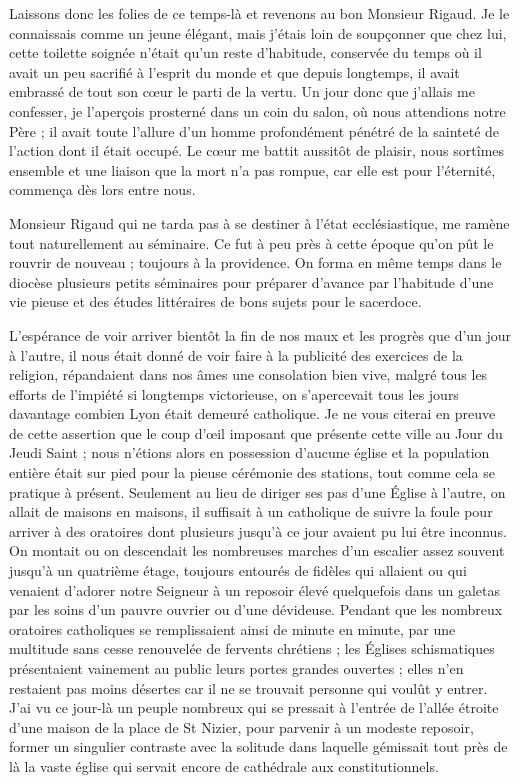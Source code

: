 \documentclass[11pt,a4paper]{report}
\begin{document}
Laissons donc les folies de ce temps-là et revenons au bon Monsieur Rigaud. Je
le connaissais comme un jeune élégant, mais j'étais loin de soupçonner que chez
lui, cette toilette soignée n'était qu'un reste d'habitude, conservée du temps
où il avait un peu sacrifié à l'esprit du monde et que depuis longtemps, il
avait embrassé de tout son cœur le parti de la vertu. Un jour donc que j'allais
me confesser, je l'aperçois prosterné dans un coin du salon, où nous attendions
notre Père ; il avait toute l'allure d'un homme profondément pénétré de la
sainteté de l'action dont il était occupé. Le cœur me battit aussitôt de
plaisir, nous sortîmes ensemble et une liaison que la mort n'a pas rompue, car
elle est pour l'éternité, commença dès lors entre nous.

Monsieur Rigaud qui ne tarda pas à se destiner à l'état ecclésiastique, me
ramène tout naturellement au séminaire. Ce fut à peu près à cette époque qu'on
pût le rouvrir de nouveau ; toujours à la providence. On forma en même temps
dans le diocèse plusieurs petits séminaires pour préparer d'avance par
l'habitude d'une vie pieuse et des études littéraires de bons sujets pour le
sacerdoce.

L'espérance de voir arriver bientôt la fin de nos maux et les progrès que d'un
jour à l'autre, il nous était donné de voir faire à la publicité des exercices
de la religion, répandaient dans nos âmes une consolation bien vive, malgré tous
les efforts de l'impiété si longtemps victorieuse, on s'apercevait tous les
jours davantage combien Lyon était demeuré catholique. Je ne vous citerai en
preuve de cette assertion que le coup d'œil imposant que présente cette ville au
Jour du Jeudi Saint ; nous n'étions alors en possession d'aucune église et la
population entière était sur pied pour la pieuse cérémonie des stations, tout
comme cela se pratique à présent. Seulement au lieu de diriger ses pas d'une
Église à l'autre, on allait de maisons en maisons, il suffisait à un catholique
de suivre la foule pour arriver à des oratoires dont plusieurs jusqu'à ce jour
avaient pu lui être inconnus. On montait ou on descendait les nombreuses marches
d'un escalier assez souvent jusqu'à un quatrième étage, toujours entourés de
fidèles qui allaient ou qui venaient d'adorer notre Seigneur à un reposoir élevé
quelquefois dans un galetas par les soins d'un pauvre ouvrier ou d'une
dévideuse. Pendant que les nombreux oratoires catholiques se remplissaient ainsi
de minute en minute, par une multitude sans cesse renouvelée de fervents
chrétiens ; les Églises schismatiques présentaient vainement au public leurs
portes grandes ouvertes ; elles n'en restaient pas moins désertes car il ne se
trouvait personne qui voulût y entrer. J'ai vu ce jour-là un peuple nombreux qui
se pressait à l'entrée de l'allée étroite d'une maison de la place de St Nizier,
pour parvenir à un modeste reposoir, former un singulier contraste avec la
solitude dans laquelle gémissait tout près de là la vaste église qui servait
encore de cathédrale aux constitutionnels.
\end{document}
